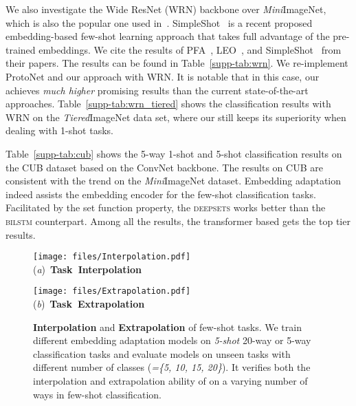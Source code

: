 We also investigate the Wide ResNet (WRN) backbone over {\it Mini}ImageNet, which is also the popular one used in~\cite{Qiao2017Few,Rusu2018Meta}. SimpleShot~\cite{Wang2019Simple} is a recent proposed embedding-based few-shot learning approach that takes full advantage of the pre-trained embeddings. We cite the results of PFA~\cite{Qiao2017Few}, LEO~\cite{Rusu2018Meta}, and SimpleShot~\cite{Wang2019Simple} from their papers.
The results can be found in Table~\ref{supp-tab:wrn}. We re-implement {ProtoNet} and our {\feat} approach with WRN. 
It is notable that in this case, our {\feat} achieves {\em much higher} promising results than the current state-of-the-art approaches. 
Table~\ref{supp-tab:wrn_tiered} shows the classification results with WRN on the {\it Tiered}ImageNet data set, where our {\feat} still keeps its superiority when dealing with 1-shot tasks.

Table~\ref{supp-tab:cub} shows the 5-way 1-shot and 5-shot classification results on the CUB dataset based on the ConvNet backbone. The results on CUB are consistent with the trend on the {\it Mini}ImageNet dataset. Embedding adaptation indeed assists the embedding encoder for the few-shot classification tasks. Facilitated by the set function property, the \textsc{deepsets} works better than the \textsc{bilstm} counterpart. Among all the results, the transformer based {\feat} gets the top tier results. 

\begin{figure}[!t]
	\small
	\centering
	\begin{minipage}[h]{4.1cm}
		\centering \texttt{[image: files/Interpolation.pdf]}\\
		\mbox{({\it a}) \textbf{Task Interpolation}}
	\end{minipage}
	\begin{minipage}[h]{4.1cm}
		\centering \texttt{[image: files/Extrapolation.pdf]}\\
		\mbox{({\it b}) \textbf{Task Extrapolation}}
	\end{minipage}
	\caption{\textbf{Interpolation} and \textbf{Extrapolation} of few-shot tasks. We train different embedding adaptation models on {\em 5-shot} 20-way or 5-way classification tasks and evaluate models on unseen tasks with different number of classes (\textit{=\{5, 10, 15, 20\}}). It verifies both the interpolation and extrapolation ability of \feat on a varying number of ways in few-shot classification.}
	\label{supp-fig:changeN}
\end{figure}

